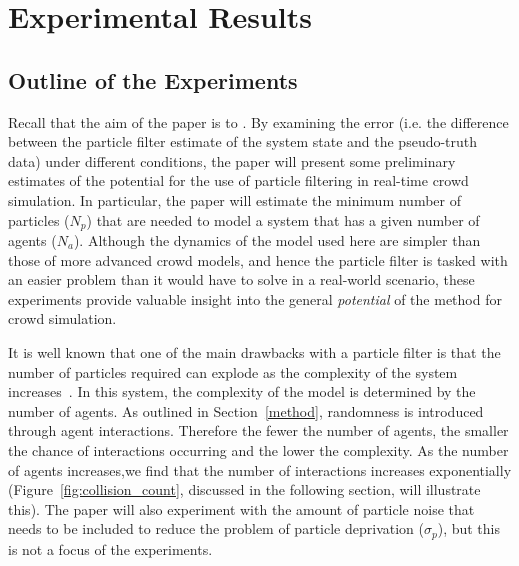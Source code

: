 \section{Experimental Results\label{experiments}}

\subsection{Outline of the Experiments}

Recall that the aim of the paper is to \aim. By examining the error (i.e. the difference between the particle filter estimate of the system state and the pseudo-truth data) under different conditions, the paper will present some preliminary estimates of the potential for the use of particle filtering in real-time crowd simulation. In particular, the paper will estimate the minimum number of particles ($N_p$) that are needed to model a system that has a given number of agents ($N_a$). Although the dynamics of the model used here are simpler than those of more advanced crowd models, and hence the particle filter is tasked with an easier problem than it would have to solve in a real-world scenario, these experiments provide valuable insight into the general \textit{potential} of the method for crowd simulation.

It is well known that one of the main drawbacks with a particle filter is that the number of particles required can explode as the complexity of the system increases~\citep[e.g.][]{snyder_obstacles_2008, carrassi_data_2018}. In this system, the complexity of the model is determined by the number of agents. As outlined in Section~\ref{method}, randomness is introduced through agent interactions.  Therefore the fewer the number of agents, the smaller the chance of interactions occurring and the lower the complexity. As the number of agents increases,we find that the number of interactions increases exponentially (Figure~\ref{fig:collision_count}, discussed in the following section, will illustrate this). The paper will also experiment with the amount of particle noise that needs to be included to reduce the problem of particle deprivation ($\sigma_p$), but this is not a focus of the experiments.


